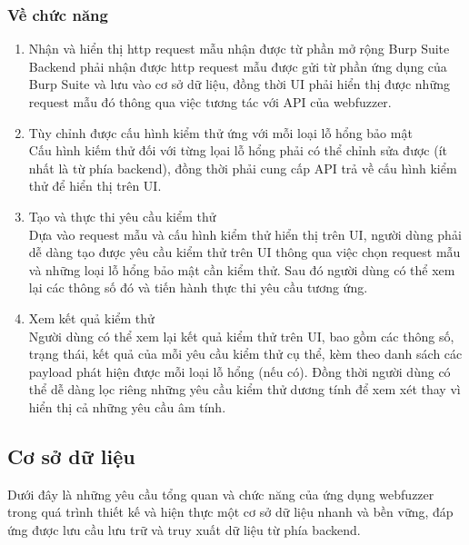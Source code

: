 \subsubsection{Về chức năng}
\begin{enumerate}
    \item Nhận và hiển thị \acrshort{http} request mẫu nhận được từ phần mở rộng Burp Suite\\
    Backend phải nhận được \acrshort{http} request mẫu được gửi từ phần ứng dụng của Burp Suite và lưu vào cơ sở dữ liệu, đồng thời UI phải hiển thị được những request mẫu đó thông qua việc tương tác với API của webfuzzer.
    \item Tùy chỉnh được cấu hình kiểm thử ứng với mỗi loại lỗ hổng bảo mật\\
    Cấu hình kiếm thử đối với từng lọai lỗ hổng phải có thể chỉnh sửa được (ít nhất là từ phía backend), đồng thời phải cung cấp API trả về cấu hình kiểm thử để hiển thị trên UI.
    \item Tạo và thực thi yêu cầu kiểm thử\\
    Dựa vào request mẫu và cấu hình kiểm thử hiển thị trên UI, người dùng phải dễ dàng tạo được yêu cầu kiểm thử trên UI thông qua việc chọn request mẫu và những loại lỗ hổng bảo mật cần kiểm thử. Sau đó người dùng có thể xem lại các thông số đó và tiến hành thực thi yêu cầu tương ứng.
    \item Xem kết quả kiểm thử\\
    Người dùng có thể xem lại kết quả kiểm thử trên UI, bao gồm các thông số, trạng thái, kết quả của mỗi yêu cầu kiểm thử cụ thể, kèm theo danh sách các payload phát hiện được mỗi loại lỗ hổng (nếu có). Đồng thời người dùng có thể dễ dàng lọc riêng những yêu cầu kiểm thử dương tính để xem xét thay vì hiển thị cả những yêu cầu âm tính.
\end{enumerate}
\subsection{Cơ sở dữ liệu}
Dưới đây là những yêu cầu tổng quan và chức năng của ứng dụng webfuzzer trong quá trình thiết kế và hiện thực một cơ sở dữ liệu nhanh và bền vững, đáp ứng được lưu cầu lưu trữ và truy xuất dữ liệu từ phía backend.

